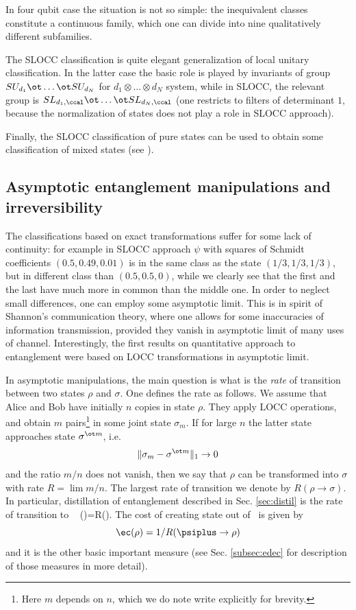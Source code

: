 \documentclass[rmp,12pt,preprint]{revtex4-2}
\begin{document}
In four qubit case the situation is not so simple: the inequivalent
classes constitute a continuous family, which one can divide into nine
qualitatively different subfamilies.

The SLOCC classification is quite elegant generalization of local
unitary classification.  In the latter case the basic role is played
by invariants of group $SU_{d_1}\ot \ldots \ot SU_{d_N}$ for
$d_1\otimes \ldots \otimes d_N$ system, while in SLOCC, the relevant
group is $SL_{d_1,\ccal}\ot \ldots \ot SL_{d_N,\ccal}$ (one restricts
to filters of determinant $1$, because the normalization of states
does not play a role in SLOCC approach).

Finally, the SLOCC classification of pure states can be used to obtain
some classification of mixed states (see
\cite{AcinBLS2001-wghz-mixed,MiyakeV2003-22n}).


\subsection{Asymptotic entanglement manipulations and irreversibility}
\label{subsec:mixed_asym_trans}
The classifications based on exact transformations suffer for some
lack of continuity: for example in SLOCC approach $\psi$ with squares
of Schmidt coefficients $(0.5,0.49,0.01)$ is in the same class as the
state $(1/3,1/3,1/3)$, but in different class than $(0.5,0.5,0)$,
while we clearly see that the first and the last have much more in
common than the middle one. In order to neglect small differences, one
can employ some asymptotic limit. This is in spirit of Shannon's
communication theory, where one allows for some inaccuracies of
information transmission, provided they vanish in asymptotic limit of
many uses of channel. Interestingly, the first results on quantitative
approach to entanglement \cite{BBPS1996,BDSW1996,BBPSSW1996} were
based on LOCC transformations in asymptotic limit.

In asymptotic manipulations, the main question is what is the {\it
  rate} of transition between two states $\rho$ and $\sigma$. One defines the rate as follows. We assume that Alice and Bob have initially $n$ copies in state $\rho$. They apply LOCC operations, and obtain $m$ pairs\footnote{Here $m$ depends on $n$, which we do note write explicitly for brevity.} in some joint state
$\sigma_m$. If for large $n$ the latter state approaches state
$\sigma^{\ot m}$, i.e.
\begin{equation}
\|\sigma_m - \sigma^{\ot m}\|_1\to 0
\end{equation}
and the ratio $m/n$ does not vanish, then
we say that $\rho$ can be transformed into $\sigma$ with rate $R=\lim
m/n$. The largest rate of transition we denote by $R(\rho\to
\sigma)$. In particular, distillation of entanglement described in
Sec.  \ref{sec:distil} is the rate of transition to \eprstate\ \be
\ed(\rho)=R(\rho \to \psiplus). \ee The cost of creating state out of
\eprstates\ is given by \begin{equation} \ec(\rho)=1/R(\psiplus\to
  \rho) \end{equation} and it is the other basic important measure
(see Sec.  \ref{subsec:edec} for description of those measures in more
detail).
\end{document}
